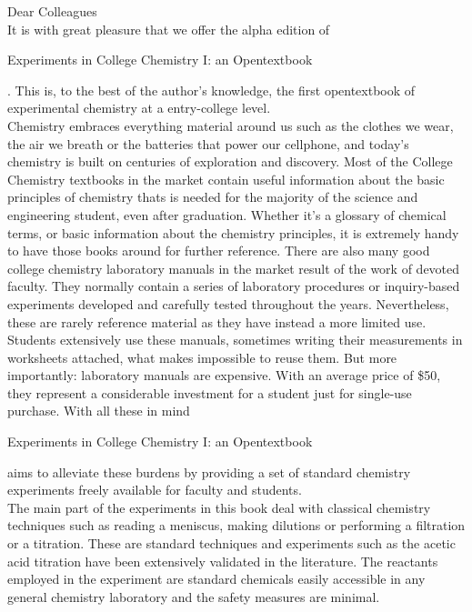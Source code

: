 \documentclass[main.tex]{subfiles}
\begin{document}
\pagestyle{style1}

\begin{fullwidth}
\begin{multicols*}{2}


Dear Colleagues\\
	It is with great pleasure that we offer the alpha edition of \begin{it}Experiments in College Chemistry I: an Opentextbook\end{it}. This is, to the best of the author's knowledge, the first opentextbook of experimental chemistry at a entry-college level.\\
	Chemistry embraces everything material around us such as the clothes we wear, the air we breath or the batteries that power our cellphone, and today's chemistry is built on centuries of exploration and discovery. Most of the College Chemistry textbooks in the market  contain useful information about the basic principles of chemistry thats is needed for the majority of the science and engineering student, even after graduation. Whether it's a glossary of chemical terms, or basic information about the chemistry principles, it is extremely handy to have those books around for further reference. There are also many good college chemistry laboratory manuals in the market result of the work of devoted faculty. They normally contain a series of laboratory procedures or inquiry-based experiments developed and carefully tested throughout the years. Nevertheless, these are rarely reference material as they have instead a more limited use. Students extensively use these manuals, sometimes writing their measurements in worksheets attached, what makes impossible to reuse them. But more importantly: laboratory manuals are expensive. With an average price of \$50, they represent a considerable investment for a student just for single-use purchase. With all these in mind \begin{it}Experiments in College Chemistry I: an Opentextbook\end{it} aims to alleviate these burdens by providing a set of standard chemistry experiments freely available for faculty and students.\\
	The main part of the experiments in this book deal with classical chemistry techniques such as reading a meniscus, making dilutions or performing a filtration or a titration. These are standard techniques and experiments such as the acetic acid titration have been extensively validated in the literature. The reactants employed in the experiment are standard chemicals easily accessible in any general chemistry laboratory and the safety measures are minimal.\\

\end{multicols*}
\end{fullwidth}
\end{document}
